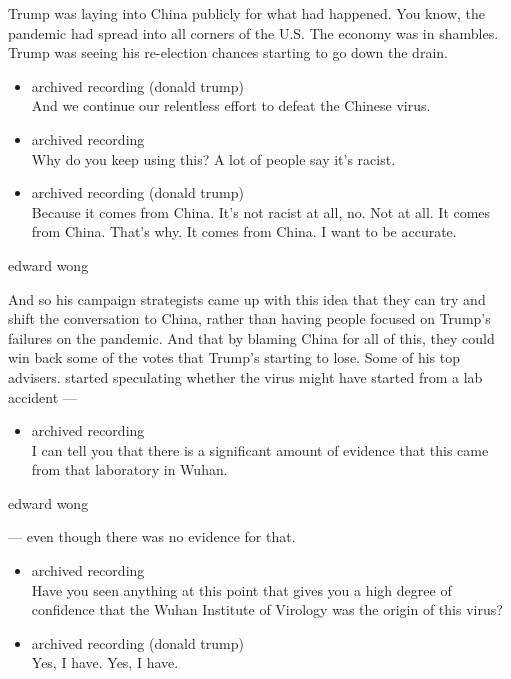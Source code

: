 Trump was laying into China publicly for what had happened. You know,
the pandemic had spread into all corners of the U.S. The economy was in
shambles. Trump was seeing his re-election chances starting to go down
the drain.

\begin{itemize}
\item
  archived recording (donald trump)\\
  And we continue our relentless effort to defeat the Chinese virus.
\item
  archived recording\\
  Why do you keep using this? A lot of people say it's racist.
\item
  archived recording (donald trump)\\
  Because it comes from China. It's not racist at all, no. Not at all.
  It comes from China. That's why. It comes from China. I want to be
  accurate.
\end{itemize}

edward wong

And so his campaign strategists came up with this idea that they can try
and shift the conversation to China, rather than having people focused
on Trump's failures on the pandemic. And that by blaming China for all
of this, they could win back some of the votes that Trump's starting to
lose. Some of his top advisers. started speculating whether the virus
might have started from a lab accident ---

\begin{itemize}
\tightlist
\item
  archived recording\\
  I can tell you that there is a significant amount of evidence that
  this came from that laboratory in Wuhan.
\end{itemize}

edward wong

--- even though there was no evidence for that.

\begin{itemize}
\item
  archived recording\\
  Have you seen anything at this point that gives you a high degree of
  confidence that the Wuhan Institute of Virology was the origin of this
  virus?
\item
  archived recording (donald trump)\\
  Yes, I have. Yes, I have.
\end{itemize}

